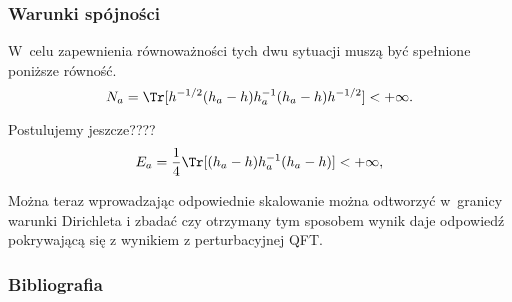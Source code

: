 \documentclass[10pt,t]{beamer}
\begin{document}
\begin{frame}
  \frametitle{Warunki spójności}


  W~celu zapewnienia równoważności tych dwu sytuacji muszą być spełnione
  poniższe równość.
  \begin{equation}
    \label{eq:3}
    N_{ a } =
    \Tr[ h^{ -1/2 } ( h_{ a } - h ) h_{ a }^ { -1 } ( h_{ a } - h ) h^{ -1/2 } ]
    < +\infty .
  \end{equation}

  Postulujemy jeszcze????
  \begin{equation}
    \label{eq:34}
    E_{ a } =
    \frac{ 1 }{ 4 } \Tr[ ( h_{ a } - h ) h_{ a }^ { -1 } ( h_{ a } - h ) ]
    < +\infty ,
  \end{equation}


  Można teraz wprowadzając odpowiednie skalowanie można odtworzyć w~granicy
  warunki Dirichleta i zbadać czy otrzymany tym sposobem wynik daje
  odpowiedź pokrywającą się z wynikiem z perturbacyjnej QFT.

\end{frame}




















\begin{frame}
  \frametitle{Bibliografia}


  

  {}

\end{frame}











\end{document}
